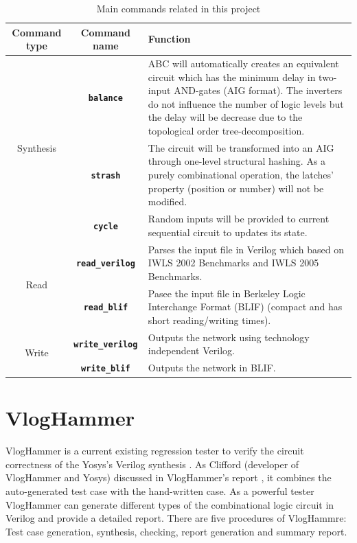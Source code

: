 \begin{table}[htb]
    \centering
    \begin{tabular}{c|c|m{8cm}}
        \hline
       \textbf{Command type} & \textbf{Command name} & \textbf{Function}\\
        \hline
     \multirow{3}{*}{Synthesis}&\textbf{\texttt{balance}} & ABC will automatically creates an equivalent circuit which has the minimum delay in two-input AND-gates (AIG format). The inverters do not influence the number of logic levels but the delay will be decrease due to the topological order tree-decomposition. \\
     \cline{2-3}
     & \textbf{\texttt{strash}}& The circuit will be transformed into an AIG through one-level structural hashing. As a purely combinational operation, the latches' property (position or number) will not be modified.\\
     \cline{2-3}
     & \textbf{\texttt{cycle}}& Random inputs will be provided to current sequential circuit to updates its state.\\
     \hline
     \multirow{2}{*}{Read}&\textbf{\texttt{read\_verilog}}& Parses the input file in Verilog which based on IWLS 2002 Benchmarks and  IWLS 2005 Benchmarks. \\
     \cline{2-3}
     & \textbf{\texttt{read\_blif}} & Pasee the input file in Berkeley Logic Interchange Format (BLIF) (compact and has short reading/writing times).\\
     \hline
     \multirow{2}{*}{Write}&\textbf{\texttt{write\_verilog}}& Outputs the network using technology independent Verilog.\\
     \cline{2-3}
     & \textbf{\texttt{write\_blif}}& Outputs the network in BLIF.\\
     \hline
\end{tabular}
    \caption{\footnotesize Main commands related in this project\cite{manual2006quick}}
    \label{tab:command}
\end{table}



\section{VlogHammer}
VlogHammer is a current existing regression tester to verify the circuit correctness of the Yosys's Verilog synthesis \cite{wolf2016yosys}. As Clifford (developer of VlogHammer and Yosys) discussed in VlogHammer's report \cite{wolf2016yosys}, it combines the auto-generated test case with the hand-written case. As a powerful tester VlogHammer can generate different types of the combinational logic circuit in Verilog and provide a detailed report. There are five procedures of VlogHammre: Test case generation, synthesis, checking, report generation and summary report. 

